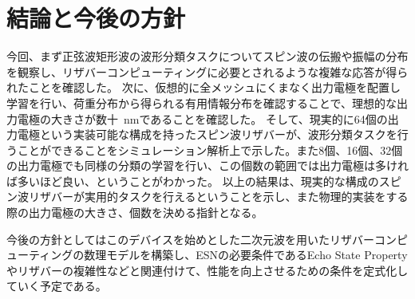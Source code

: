 \documentclass[a4j, twocolumn]{jsarticle}
\begin{document}
\section{結論と今後の方針}
\label{sec:conclusion}
今回、まず正弦波矩形波の波形分類タスクについてスピン波の伝搬や振幅の分布を観察し、リザバーコンピューティングに必要とされるような複雑な応答が得られたことを確認した。
次に、仮想的に全メッシュにくまなく出力電極を配置し学習を行い、荷重分布から得られる有用情報分布を確認することで、理想的な出力電極の大きさが数十~nmであることを確認した。
そして、現実的に64個の出力電極という実装可能な構成を持ったスピン波リザバーが、波形分類タスクを行うことができることをシミュレーション解析上で示した。また8個、16個、32個の出力電極でも同様の分類の学習を行い、この個数の範囲では出力電極は多ければ多いほど良い、ということがわかった。
以上の結果は、現実的な構成のスピン波リザバーが実用的タスクを行えるということを示し、また物理的実装をする際の出力電極の大きさ、個数を決める指針となる。

今後の方針としてはこのデバイスを始めとした二次元波を用いたリザバーコンピューティングの数理モデルを構築し、ESNの必要条件であるEcho State Propertyやリザバーの複雑性などと関連付けて、性能を向上させるための条件を定式化していく予定である。







\end{document}
